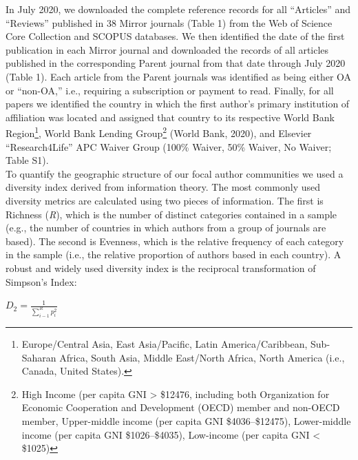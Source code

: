 \documentclass[
  english,
  man]{apa6}
\begin{document}
In July 2020, we downloaded the complete reference records for all ``Articles'' and ``Reviews'' published in 38 Mirror journals (Table 1) from the Web of Science Core Collection and SCOPUS databases. We then identified the date of the first publication in each Mirror journal and downloaded the records of all articles published in the corresponding Parent journal from that date through July 2020 (Table 1). Each article from the Parent journals was identified as being either OA or ``non-OA,'' i.e., requiring a subscription or payment to read. Finally, for all papers we identified the country in which the first author's primary institution of affiliation was located and assigned that country to its respective World Bank Region\footnote{Europe/Central Asia, East Asia/Pacific, Latin America/Caribbean, Sub-Saharan Africa, South Asia, Middle East/North Africa, North America (i.e., Canada, United States).}, World Bank Lending Group\footnote{High Income (per capita GNI \textgreater{} \$12476, including both Organization for Economic Cooperation and Development (OECD) member and non-OECD member, Upper-middle income (per capita GNI \$4036--\$12475), Lower-middle income (per capita GNI \$1026--\$4035), Low-income (per capita GNI \textless{} \$1025)} (World Bank, 2020), and Elsevier ``Research4Life'' APC Waiver Group (100\% Waiver, 50\% Waiver, No Waiver; Table S1).\\
To quantify the geographic structure of our focal author communities we used a diversity index derived from information theory. The most commonly used diversity metrics are calculated using two pieces of information. The first is Richness (\emph{R}), which is the number of distinct categories contained in a sample (e.g., the number of countries in which authors from a group of journals are based). The second is Evenness, which is the relative frequency of each category in the sample (i.e., the relative proportion of authors based in each country). A robust and widely used diversity index is the reciprocal transformation of Simpson's Index:

\(D_{2}=\frac{1}{\sum_{i-1}^{R} p_{i}^{2}}\)
\end{document}
